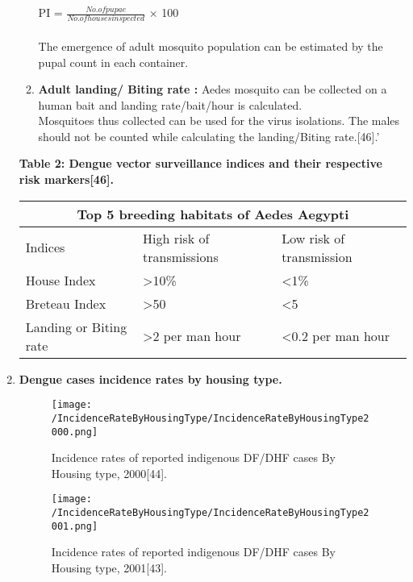 \documentclass[11pt]{exam}
\begin{document}
\begin{questions}
\begin{enumerate}
\begin{enumerate}
      PI = $\frac{No. of pupae}{No. of houses inspected}$ $\times$ 100 \\ \\
      The emergence of adult mosquito population can be estimated by the pupal count in each container. \\
\item \textbf{Adult landing/ Biting rate :} Aedes mosquito can be collected on a human bait and landing rate/bait/hour is calculated. \\ Mosquitoes thus collected can be used for the virus isolations. The males should not be counted while calculating the landing/Biting rate.[46].' %
\end{enumerate}

\textbf{Table 2: Dengue vector surveillance indices and their respective risk markers[46].} \\

\begin{tabular}{ |p{5cm}|p{5cm}|p{5cm}| }
\hline
\multicolumn{3}{|c|}{\textbf{Top 5 breeding habitats of Aedes Aegypti}} \\
\hline
Indices & High risk of transmissions & Low risk of transmission  \\
\hline
House Index & \textgreater 10\% & \textless 1\%\\
Breteau Index & \textgreater 50 & \textless 5\\
Landing or Biting rate & \textgreater2 per man hour & \textless 0.2 per man hour\\
\hline
\end{tabular}

\newpage
\item \textbf{Dengue cases incidence rates by housing type.}
\begin{figure}[H]
  \centering
   \texttt{[image: /IncidenceRateByHousingType/IncidenceRateByHousingType2000.png]} 
  \caption{Incidence rates of reported indigenous DF/DHF cases By Housing type, 2000[44].}
   \label{Incidence rate of indigenous DF/DHF cases by housing type.}
\end{figure} 

\begin{figure}[H]
  \centering
   \texttt{[image: /IncidenceRateByHousingType/IncidenceRateByHousingType2001.png]} 
  \caption{Incidence rates of reported indigenous DF/DHF cases By Housing type, 2001[43].}
   \label{Incidence rate of indigenous DF/DHF cases by housing type.}
\end{figure} 


\end{enumerate}
\end{questions}
\end{document}
